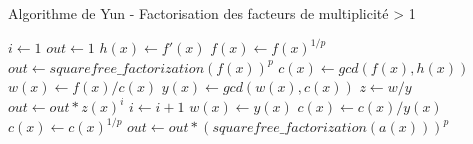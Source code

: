 \begin{algorithm}
  \caption{Algorithme de Yun - Factorisation des facteurs de multiplicit\'e > 1}
  \begin{algorithmic}[1]
    \Statex
      \State $i \gets 1$
      \State $out \gets 1$
      \State $h(x) \gets f'(x)$
        \State $f(x) \gets f(x)^{1/p}$
        \State $out \gets squarefree\_factorization(f(x))^p$
      \Else
        \State $c(x) \gets gcd(f(x), h(x))$
        \State $w(x) \gets f(x)/c(x)$
          \State $y(x) \gets gcd(w(x), c(x))$
          \State $z \gets w/y$
          \State $out \gets out*z(x)^i$
          \State $i \gets i+1$
          \State $w(x) \gets y(x)$
          \State $c(x) \gets c(x)/y(x)$
        \EndWhile
          \State $c(x) \gets c(x)^{1/p}$
          \State $out \gets out*(squarefree\_factorization(a(x)))^p $
        \EndIf
      \EndIf
      \State {}
    \EndFunction
  \end{algorithmic}
\end{algorithm}
